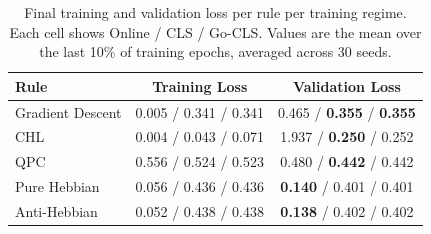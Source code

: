 \begin{table}[H]
\centering
\caption{Final training and validation loss per rule per training regime. Each cell shows \textcolor{online}{Online} / \textcolor{cls}{CLS} / \textcolor{gocls}{Go-CLS}. Values are the mean over the last 10\% of training epochs, averaged across 30 seeds.}
\label{tab:summary_losses}
\begin{tabular}{lcc}
\toprule
\textbf{Rule} & \textbf{Training Loss} & \textbf{Validation Loss} \\
\midrule
Gradient Descent & \textcolor{online}{0.005} / \textcolor{cls}{0.341} / \textcolor{gocls}{0.341} & \textcolor{online}{0.465} / \textcolor{cls}{\textbf{0.355}} / \textcolor{gocls}{\textbf{0.355}} \\
CHL & \textcolor{online}{0.004} / \textcolor{cls}{0.043} / \textcolor{gocls}{0.071} & \textcolor{online}{1.937} / \textcolor{cls}{\textbf{0.250}} / \textcolor{gocls}{0.252} \\
QPC & \textcolor{online}{0.556} / \textcolor{cls}{0.524} / \textcolor{gocls}{0.523} & \textcolor{online}{0.480} / \textcolor{cls}{\textbf{0.442}} / \textcolor{gocls}{0.442} \\
Pure Hebbian & \textcolor{online}{0.056} / \textcolor{cls}{0.436} / \textcolor{gocls}{0.436} & \textcolor{online}{\textbf{0.140}} / \textcolor{cls}{0.401} / \textcolor{gocls}{0.401} \\
Anti-Hebbian & \textcolor{online}{0.052} / \textcolor{cls}{0.438} / \textcolor{gocls}{0.438} & \textcolor{online}{\textbf{0.138}} / \textcolor{cls}{0.402} / \textcolor{gocls}{0.402} \\
\bottomrule
\end{tabular}
\end{table}